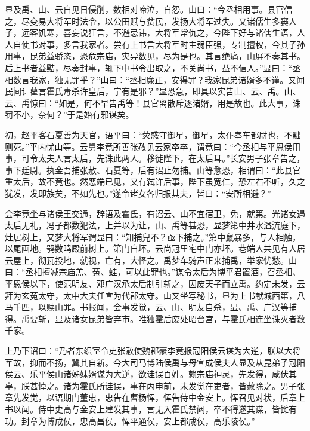 \documentclass[12pt,UTF8]{ctexbook}
\begin{document}
显及禹、山、云自见日侵削，数相对啼泣，自怨。山曰：“今丞相用事。县官信之，尽变易大将军时法令，以公田赋与贫民，发扬大将军过失。又诸儒生多窭人子，远客饥寒，喜妄说狂言，不避忌讳，大将军常仇之，今陛下好与诸儒生语，人人自使书对事，多言我家者。尝有上书言大将军时主弱臣强，专制擅权，今其子孙用事，昆弟益骄恣，恐危宗庙，灾异数见，尽为是也。其言绝痛，山屏不奏其书。后上书者益黠，尽奏封事，辄下中书令出取之，不关尚书，益不信人。”显曰：“丞相数言我家，独无罪乎？”山曰：“丞相廉正，安得罪？我家昆弟诸婿多不谨。又闻民间讠雚言霍氏毒杀许皇后，宁有是邪？”显恐急，即具以实告山、云、禹。山、云、禹惊曰：“如是，何不早告禹等！县官离散斥逐诸婿，用是故也。此大事，诛罚不小，奈何？”于是始有邪谋矣。



初，赵平客石夏善为天官，语平曰：“荧惑守御星，御星，太仆奉车都尉也，不黜则死。”平内忧山等。云舅李竟所善张赦见云家卒卒，谓竟曰：“今丞相与平恩侯用事，可令太夫人言太后，先诛此两人。移徙陛下，在太后耳。”长安男子张章告之，事下廷尉。执金吾捕张赦、石夏等，后有诏止勿捕。山等愈恐，相谓曰：“此县官重太后，故不竟也。然恶端已见，又有弑许后事，陛下虽宽仁，恐左右不听，久之犹发，发即族矣，不如先也。”遂令诸女各归报其夫，皆曰：“安所相避？”



会李竟坐与诸侯王交通，辞语及霍氏，有诏云、山不宜宿卫，免，就第。光诸女遇太后无礼，冯子都数犯法，上并以为让，山、禹等甚恐，显梦第中井水溢流庭下，灶居树上，又梦大将军谓显曰：“知捕兒不？亟下捕之。”第中鼠暴多，与人相触，以尾画地。鸮数鸣殿前树上。第门自坏。云尚冠里宅中门亦坏。巷端人共见有人居云屋上，彻瓦投地，就视，亡有，大怪之。禹梦车骑声正来捕禹，举家忧愁。山曰：“丞相擅减宗庙羔、菟、蛙，可以此罪也。”谋令太后为博平君置酒，召丞相、平恩侯以下，使范明友、邓广汉承太后制引斩之，因废天子而立禹。约定未发，云拜为玄菟太守，太中大夫任宣为代郡太守。山又坐写秘书，显为上书献城西第，八马千匹，以赎山罪。书报闻，会事发觉，云、山、明友自杀，显、禹、广汉等捕得。禹要斩，显及诸女昆弟皆弃市。唯独霍后废处昭台宫，与霍氏相连坐诛灭者数千家。



上乃下诏曰：“乃者东织室令史张赦使魏郡豪李竟报冠阳侯云谋为大逆，朕以大将军故，抑而不扬，冀其自新。今大司马博陆侯禹与母宣成侯夫人显及从昆弟子冠阳侯云、乐平侯山诸姊妹婿谋为大逆，欲诖误百姓。赖宗庙神灵，先发得，咸伏其辜，朕甚悼之。诸为霍氏所诖误，事在丙申前，未发觉在吏者，皆赦除之。男子张章先发觉，以语期门董忠，忠告在曹杨恽，恽告侍中金安上。恽召见对状，后章上书以闻。侍中史高与金安上建发其事，言无入霍氏禁闼，卒不得遂其谋，皆雠有功。封章为博成侯，忠高昌侯，恽平通侯，安上都成侯，高乐陵侯。”
\end{document}

